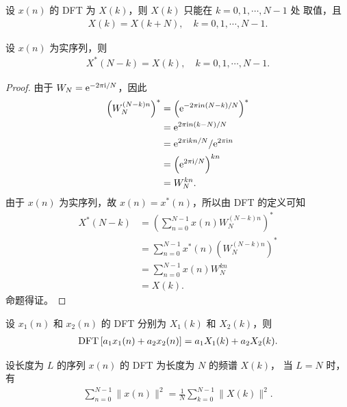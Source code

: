 \begin{property}
    设 $x(n)$ 的 DFT 为 $X(k)$，则 $X(k)$ 只能在 $k = 0, 1, \cdots, N - 1$ 处
    取值，且
    \begin{align*}
        X(k) = X(k + N), \quad k = 0, 1, \cdots, N - 1.
    \end{align*}
\end{property}

\begin{property}
    设 $x(n)$ 为实序列，则
    \begin{align*}
        X^*(N - k) = X(k), \quad k = 0, 1, \cdots, N - 1.
    \end{align*}
\end{property}

\begin{proof}
    由于 $W_N = \mathrm{e}^{-2\pi\mathrm{i}/N}$，因此
    \begin{align*}
        \left(W_N^{(N - k)n}\right)^* & = \left(\mathrm{e}^{-2\pi\mathrm{i} n(N-k)/N}\right)^* \\
        & = \mathrm{e}^{2\pi\mathrm{i} n(k-N)/N} \\
        & = \mathrm{e}^{2\pi\mathrm{i} kn/N} / \mathrm{e}^{2\pi\mathrm{i} n} \\
        & = \left(\mathrm{e}^{2\pi\mathrm{i}/N}\right)^{kn} \\
        & = W_N^{kn}.
    \end{align*}
    由于 $x(n)$ 为实序列，故 $x(n) = x^*(n)$，所以由 DFT 的定义可知
    \begin{align*}
        X^*(N - k) & = \left(\sum_{n = 0}^{N - 1} x(n)W_N^{(N - k)n}\right)^* \\
        & = \sum_{n = 0}^{N - 1} x^*(n)\left(W_N^{(N - k)n}\right)^* \\
        & = \sum_{n = 0}^{N - 1} x(n)W_N^{kn} \\
        & = X(k).
    \end{align*}
    命题得证。
\end{proof}

\begin{property}
    设 $x_1(n)$ 和 $x_2(n)$ 的 DFT 分别为 $X_1(k)$ 和 $X_2(k)$，则
    \begin{align*}
        \mathrm{DFT}\left[a_1x_1(n) + a_2x_2(n)\right] = a_1X_1(k) + a_2X_2(k).
    \end{align*}
\end{property}

\begin{property}
    设长度为 $L$ 的序列 $x(n)$ 的 DFT 为长度为 $N$ 的频谱 $X(k)$，
    当 $L = N$ 时，有
    \begin{align*}
        \sum_{n = 0}^{N - 1}\|x(n)\|^2 = \frac{1}{N}\sum_{k = 0}^{N - 1}\|X(k)\|^2.
    \end{align*}
\end{property}

